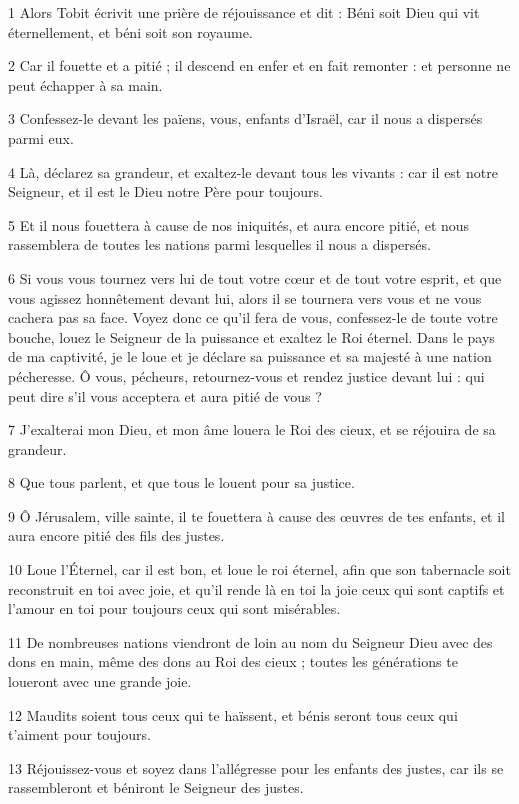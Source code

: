 \par 1 Alors Tobit écrivit une prière de réjouissance et dit : Béni soit Dieu qui vit éternellement, et béni soit son royaume.
\par 2 Car il fouette et a pitié ; il descend en enfer et en fait remonter : et personne ne peut échapper à sa main.
\par 3 Confessez-le devant les païens, vous, enfants d'Israël, car il nous a dispersés parmi eux.
\par 4 Là, déclarez sa grandeur, et exaltez-le devant tous les vivants : car il est notre Seigneur, et il est le Dieu notre Père pour toujours.
\par 5 Et il nous fouettera à cause de nos iniquités, et aura encore pitié, et nous rassemblera de toutes les nations parmi lesquelles il nous a dispersés.
\par 6 Si vous vous tournez vers lui de tout votre cœur et de tout votre esprit, et que vous agissez honnêtement devant lui, alors il se tournera vers vous et ne vous cachera pas sa face. Voyez donc ce qu'il fera de vous, confessez-le de toute votre bouche, louez le Seigneur de la puissance et exaltez le Roi éternel. Dans le pays de ma captivité, je le loue et je déclare sa puissance et sa majesté à une nation pécheresse. Ô vous, pécheurs, retournez-vous et rendez justice devant lui : qui peut dire s'il vous acceptera et aura pitié de vous ?
\par 7 J'exalterai mon Dieu, et mon âme louera le Roi des cieux, et se réjouira de sa grandeur.
\par 8 Que tous parlent, et que tous le louent pour sa justice.
\par 9 Ô Jérusalem, ville sainte, il te fouettera à cause des œuvres de tes enfants, et il aura encore pitié des fils des justes.
\par 10 Loue l'Éternel, car il est bon, et loue le roi éternel, afin que son tabernacle soit reconstruit en toi avec joie, et qu'il rende là en toi la joie ceux qui sont captifs et l'amour en toi pour toujours ceux qui sont misérables.
\par 11 De nombreuses nations viendront de loin au nom du Seigneur Dieu avec des dons en main, même des dons au Roi des cieux ; toutes les générations te loueront avec une grande joie.
\par 12 Maudits soient tous ceux qui te haïssent, et bénis seront tous ceux qui t'aiment pour toujours.
\par 13 Réjouissez-vous et soyez dans l'allégresse pour les enfants des justes, car ils se rassembleront et béniront le Seigneur des justes.
